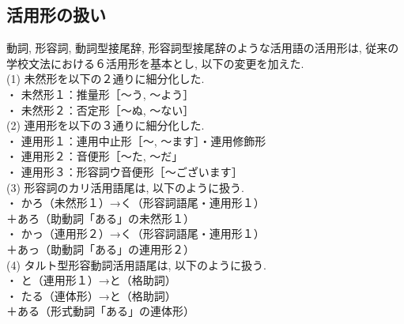 \subsection{活用形の扱い}
 動詞, 形容詞, 動詞型接尾辞, 形容詞型接尾辞のような活用語の活用形は, 
従来の学校文法における６活用形を基本とし, 以下の変更を加えた. \\
(1) 未然形を以下の２通りに細分化した. \\
\hspace*{3mm}・ 未然形１：推量形［〜う, 〜よう］\\
\hspace*{3mm}・ 未然形２：否定形［〜ぬ, 〜ない］\\
(2) 連用形を以下の３通りに細分化した. \\
\hspace*{3mm}・ 連用形１：連用中止形［〜, 〜ます］・連用修飾形\\
\hspace*{3mm}・ 連用形２：音便形［〜た, 〜だ」\\
\hspace*{3mm}・ 連用形３：形容詞ウ音便形［〜ございます］\\
(3) 形容詞のカリ活用語尾は, 以下のように扱う. \\
\hspace*{3mm}・ かろ（未然形１）→く（形容詞語尾・連用形１）\\
\hspace*{3mm}＋あろ（助動詞「ある」の未然形１）\\
\hspace*{3mm}・ かっ（連用形２）→く（形容詞語尾・連用形１）\\
\hspace*{3mm}＋あっ（助動詞「ある」の連用形２）\\
(4) タルト型形容動詞活用語尾は, 以下のように扱う. \\
\hspace*{3mm}・ と（連用形１）→と（格助詞）\\
\hspace*{3mm}・ たる（連体形）→と（格助詞）\\
\hspace*{3mm}＋ある（形式動詞「ある」の連体形）

